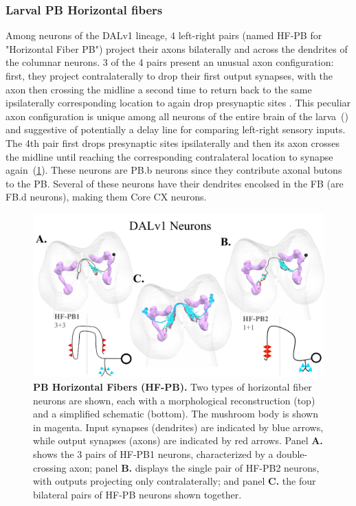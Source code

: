         \subsubsection{Larval PB Horizontal fibers}
    Among neurons of the DALv1 lineage, 4 left-right pairs (named HF-PB for "Horizontal Fiber PB") project their axons bilaterally and across the dendrites of the columnar neurons.
    3 of the 4 pairs present an unusual axon configuration: first, they project contralaterally to drop their first output synapses, with the axon then crossing the midline a second time to return back to the same ipsilaterally corresponding location to again drop presynaptic sites .
    This peculiar axon configuration is unique among all neurons of the entire brain of the larva~(\citep{winding2023connectome}) and suggestive of potentially a delay line for comparing left-right sensory inputs.
    The 4th pair first drops presynaptic sites ipsilaterally and then its axon crosses the midline until reaching the corresponding contralateral location to synapse again~(\ref{DALv1s}). These neurons are PB.b neurons since they contribute axonal butons to the PB. Several of these neurons have their dendrites encolsed in the FB (are FB.d neurons), making them Core CX neurons. 

    \begin{figure}
        \centering
        \includegraphics[width=12cm]{Figs/CX/DALV1s.pdf}
        \caption[PB Dalv1 Neurons]{\textbf{PB Horizontal Fibers (HF-PB).} Two types of horizontal fiber neurons are shown, each with a morphological reconstruction (top) and a simplified schematic (bottom). The mushroom body is shown in magenta. Input synapses (dendrites) are indicated by blue arrows, while output synapses (axons) are indicated by red arrows. Panel \textbf{A.} shows the 3 pairs of HF-PB1 neurons, characterized by a double-crossing axon; panel \textbf{B.} displays the single pair of HF-PB2 neurons, with outputs projecting only contralaterally; and panel \textbf{C.} the four bilateral pairs of HF-PB neurons shown together.}
        \label{DALv1s}
    \end{figure}

